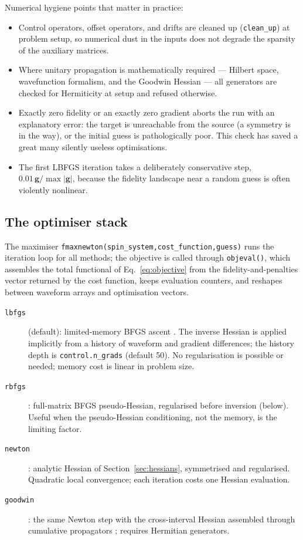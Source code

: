 \documentclass[11pt,a4paper]{article}
\newcommand{\code}[1]{\texttt{#1}}
\begin{document}
Numerical hygiene points that matter in practice:
\begin{itemize}
\item Control operators, offset operators, and drifts are cleaned up
  (\code{clean\_up}) at problem setup, so numerical dust in the inputs
  does not degrade the sparsity of the auxiliary matrices.
\item Where unitary propagation is mathematically required --- Hilbert
  space, wavefunction formalism, and the Goodwin Hessian --- all
  generators are checked for Hermiticity at setup and refused otherwise.
\item Exactly zero fidelity or an exactly zero gradient aborts the run
  with an explanatory error: the target is unreachable from the source
  (a symmetry is in the way), or the initial guess is pathologically
  poor. This check has saved a great many silently useless optimisations.
\item The first LBFGS iteration takes a deliberately conservative step,
  $0.01\,\mathbf{g}/\max|\mathbf{g}|$, because the fidelity landscape
  near a random guess is often violently nonlinear.
\end{itemize}

\subsection{The optimiser stack}
\label{sec:optimisers}

The maximiser \code{fmaxnewton(spin\_system,cost\_function,guess)} runs
the iteration loop for all methods; the objective is called through
\code{objeval()}, which assembles the total functional of
Eq.~\eqref{eq:objective} from the fidelity-and-penalties vector returned
by the cost function, keeps evaluation counters, and reshapes between
waveform arrays and optimisation vectors.

\begin{description}
\item[\code{lbfgs}] (default): limited-memory BFGS ascent
  \cite{liu1989}. The inverse Hessian is applied implicitly from a
  history of waveform and gradient differences; the history depth is
  \code{control.n\_grads} (default 50). No regularisation is possible or
  needed; memory cost is linear in problem size.
\item[\code{rbfgs}]: full-matrix BFGS pseudo-Hessian, regularised before
  inversion (below). Useful when the pseudo-Hessian conditioning, not the
  memory, is the limiting factor.
\item[\code{newton}]: analytic Hessian of
  Section~\ref{sec:hessians}, symmetrised and regularised. Quadratic
  local convergence; each iteration costs one Hessian evaluation.
\item[\code{goodwin}]: the same Newton step with the cross-interval
  Hessian assembled through cumulative propagators
  \cite{goodwin2016}; requires Hermitian generators.
\end{description}
\end{document}
